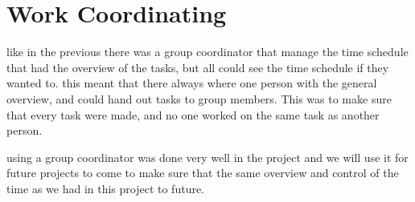 \section{Work Coordinating}
like in the previous there was a group coordinator that manage the time schedule that had the overview of the tasks, but all could see the time schedule if they wanted to. this meant that there always where one person with the general overview, and could hand out tasks to group members. This was to make sure that every task were made, and no one worked on the same task as another person.

using a group coordinator was done very well in the project and we will use it for future projects to come to make sure that the same overview and control of the time as we had in this project to future.